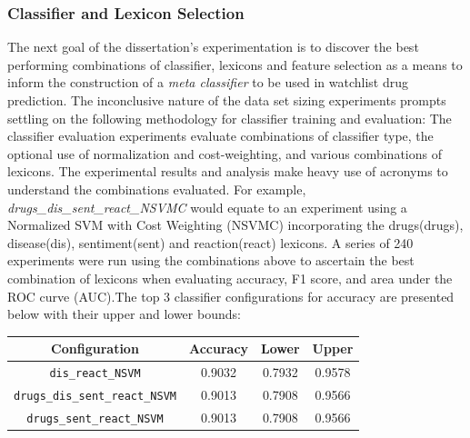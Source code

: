 \documentclass[twoside,11pt]{article}
\begin{document}
\subsubsection{Classifier and Lexicon Selection}
The next goal of the dissertation's experimentation is to discover the best performing combinations of classifier, lexicons and feature selection as a means to inform the construction of a \textit{meta classifier} to be used in watchlist drug prediction. The inconclusive nature of the data set sizing experiments prompts settling on the following methodology for classifier
training and evaluation:
The classifier evaluation experiments evaluate combinations of classifier type, the optional use of normalization and cost-weighting, and various combinations of lexicons. The experimental results and analysis make heavy use of acronyms to understand the combinations evaluated. For example, \textit{drugs\_dis\_sent\_react\_NSVMC} would equate to an experiment using a Normalized SVM with Cost Weighting (NSVMC) incorporating the drugs(drugs), disease(dis), sentiment(sent) and reaction(react) lexicons. A series of 240 experiments were run using the combinations above to ascertain the best combination of lexicons when evaluating accuracy, F1 score, and area under the ROC curve (AUC).The top 3 classifier configurations for accuracy are presented below with their upper and lower bounds:
\begin{center}
  \begin{tabular}{||c c c c||}
    \hline
    Configuration & Accuracy & Lower & Upper \\
    \hline\hline
    \verb|dis_react_NSVM| & 0.9032 & 0.7932 & 0.9578 \\
    \hline
    \verb|drugs_dis_sent_react_NSVM| & 0.9013 & 0.7908 & 0.9566 \\
    \hline
    \verb|drugs_sent_react_NSVM| & 0.9013 & 0.7908 & 0.9566 \\
    \hline
  \end{tabular}
\end{center}
\end{document}
